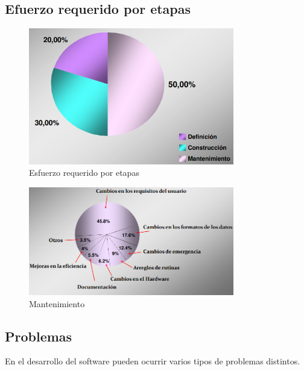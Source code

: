 \documentclass{article}
\begin{document}
\subsection{Efuerzo requerido por etapas}
\begin{figure}[h]
\centering
\caption{Esfuerzo requerido por etapas}
\includegraphics[scale=1,width=0.8\textwidth]{esfuerzo_requerido.png}
\end{figure}

\begin{figure}
\centering
\caption{Mantenimiento}
\includegraphics[scale=1,width=0.8\textwidth]{mantenimiento.png}
\end{figure}

\subsection{Problemas}
En el desarrollo del software pueden ocurrir varios tipos de problemas distintos.
\end{document}
